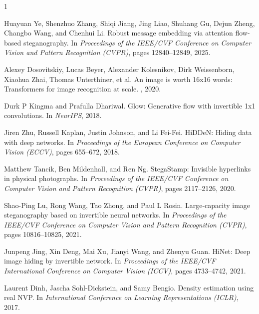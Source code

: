 \documentclass[10pt,twocolumn,letterpaper]{article}
\begin{document}
{
    \small
    
    \begin{thebibliography}{1}

    Huayuan Ye, Shenzhuo Zhang, Shiqi Jiang, Jing Liao, Shuhang Gu, Dejun Zheng, Changbo Wang, and Chenhui Li.
    \newblock Robust message embedding via attention flow-based steganography.
    \newblock In {\em Proceedings of the IEEE/CVF Conference on Computer Vision and Pattern Recognition (CVPR)}, pages 12840--12849, 2025.

    Alexey Dosovitskiy, Lucas Beyer, Alexander Kolesnikov, Dirk Weissenborn, Xiaohua Zhai, Thomas Unterthiner, et al.
    \newblock An image is worth 16x16 words: Transformers for image recognition at scale.
    , 2020.

    Durk P Kingma and Prafulla Dhariwal.
    \newblock Glow: Generative flow with invertible 1x1 convolutions.
    \newblock In {\em NeurIPS}, 2018.

    Jiren Zhu, Russell Kaplan, Justin Johnson, and Li Fei-Fei.
    \newblock HiDDeN: Hiding data with deep networks.
    \newblock In {\em Proceedings of the European Conference on Computer Vision (ECCV)}, pages 655--672, 2018.

    Matthew Tancik, Ben Mildenhall, and Ren Ng.
    \newblock StegaStamp: Invisible hyperlinks in physical photographs.
    \newblock In {\em Proceedings of the IEEE/CVF Conference on Computer Vision and Pattern Recognition (CVPR)}, pages 2117--2126, 2020.

    Shao-Ping Lu, Rong Wang, Tao Zhong, and Paul L Rosin.
    \newblock Large-capacity image steganography based on invertible neural networks.
    \newblock In {\em Proceedings of the IEEE/CVF Conference on Computer Vision and Pattern Recognition (CVPR)}, pages 10816--10825, 2021.

    Junpeng Jing, Xin Deng, Mai Xu, Jianyi Wang, and Zhenyu Guan.
    \newblock HiNet: Deep image hiding by invertible network.
    \newblock In {\em Proceedings of the IEEE/CVF International Conference on Computer Vision (ICCV)}, pages 4733--4742, 2021.

    Laurent Dinh, Jascha Sohl-Dickstein, and Samy Bengio.
    \newblock Density estimation using real NVP.
    \newblock In {\em International Conference on Learning Representations (ICLR)}, 2017.


\end{thebibliography}}
\end{document}
